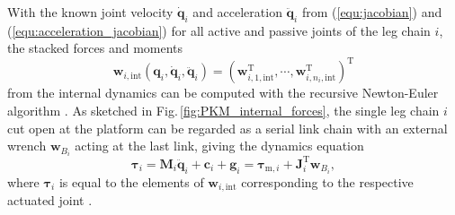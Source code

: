 \documentclass[fleqn,a4paper,10pt]{article}
\newcommand{\bm}[1]{\mathbf{#1}}
\newcommand{\transp}[0]{{\mathrm{T}}}
\renewenvironment{figure}
  {\par\vspace{6pt}\noindent\minipage{\linewidth}}
  {\endminipage\par\vspace{6pt}}
\begin{document}
\begin{multicols}{2}
With the known joint velocity $\dot{\bm{q}}_i$ and acceleration $\ddot{\bm{q}}_i$ from (\ref{equ:jacobian}) and (\ref{equ:acceleration_jacobian}) for all active and passive joints of the leg chain $i$, the stacked forces and moments
%
\begin{equation}
\bm{w}_{i,\mathrm{int}}(\bm{q}_i,\dot{\bm{q}}_i,\ddot{\bm{q}}_i)
=
(\bm{w}_{i,1,\mathrm{int}}^\transp,\cdots,\bm{w}_{i,n_i,\mathrm{int}}^\transp)^\transp
\label{equ:intforce_leg}
\end{equation} %
%
from the internal dynamics can be computed with the recursive Newton-Euler algorithm  \cite{KhalilDom2002,SaminFis2013}.
As sketched in Fig.\,\ref{fig:PKM_internal_forces}, the single leg chain $i$ cut open at the platform can be regarded as a serial link chain with an external wrench $\bm{w}_{B_i}$ acting at the last link, giving the dynamics equation
\begin{equation}
\bm{\tau}_{i}
=\bm{M}_i \ddot{\bm{q}}_i + \bm{c}_i + \bm{g}_i
=\bm{\tau}_{\mathrm{m},i} + \bm{J}_{i}^{\transp} \bm{w}_{B_i},
\label{equ:invdyn_leg}
\end{equation}
%
where $\bm{\tau}_{i}$ is equal to the elements of $\bm{w}_{i,\mathrm{int}}$ corresponding to the respective actuated joint \cite{KhalilDom2002}.

\begin{figure}
    \centering
    \vspace{-0.1cm} %
    
    \vspace{-0.3cm} %
    \label{fig:PKM_internal_forces}
\end{figure}


\end{multicols}
\end{document}
